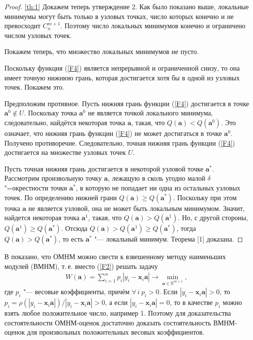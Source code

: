 \begin{proof}{\ref{th:1}}
Докажем теперь утверждение 2. Как было показано выше, локальные 
минимумы могут быть только в узловых точках, число которых конечно 
и не превосходит $C_{n}^{m+1}$. Поэтому число локальных минимумов
конечно и ограничено числом узловых точек.

Покажем теперь, что множество локальных минимумов не пусто.

Поскольку функция (\ref{F4}) является непрерывной и ограниченной 
снизу, то она имеет точную нижнюю грань,
которая достигается хотя бы в одной из узловых точек. Покажем это.

Предположим противное. Пусть нижняя грань функции (\ref{F4}) 
достигается в точке $\mathbf{a}^{0}\notin U$. Поскольку точка $\mathbf{a}^{0}$ не 
является точкой локального минимума, следовательно, найдётся 
некоторая точка $\mathbf{a}$, такая, что $Q(\mathbf{a})<Q(\mathbf{a}^{0})$. 
Это означает, что нижняя грань функции (\ref{F4}) не может достигаться в точке $\mathbf{a}^{0}$.
Получено противоречие. Следовательно, точная нижняя грань функции (\ref{F4})
достигается на множестве узловых точек $U$.

Пусть точная нижняя грань достигается в некоторой узловой точке $\mathbf{a}^{*}$.
Рассмотрим произвольную точку $\mathbf{a}$, лежащую в сколь угодно малой $\delta$"=окрестности
точки $\mathbf{a}^{*}$, в которую не попадает ни одна из остальных узловых точек. 
По определению нижней грани $Q(\mathbf{a})\ge Q(\mathbf{a}^{*})$. Поскольку при этом точка $\mathbf{a}$
не является узловой, она не может быть локальным минимумом. Значит,
найдется некоторая точка $\mathbf{a}^{1}$, такая, что $Q(\mathbf{a})>Q(\mathbf{a}^{1})$. Но,
с другой стороны, $Q(\mathbf{a}^{1})\ge Q(\mathbf{a}^{*})$. Отсюда $Q(\mathbf{a})>Q(\mathbf{a}^{1})\ge Q(\mathbf{a}^{*})$,
тогда $Q(\mathbf{a})>Q(\mathbf{a}^{*})$, то есть $\mathbf{a}^{*}$ "--- локальный минимум. Теорема [1] доказана.
\end{proof}

\smallskip

В {\cite{eighth}} показано, что ОМНМ можно свести к взвешенному методу наименьших модулей (ВМНМ), т.\,е. вместо (\ref{F2}) решать
задачу
\begin{gather} \label{F7}
W(\mathbf{a})=\sum_{i=1}^n
p_{i}\left|y_{i}-\mathbf{x}_{i}\mathbf{a} \right|\rightarrow \min
_{\mathbf{a} \in \mathbb{R}^{m+1}},
\end{gather}
 где $p_{i}$ "--- весовые коэффициенты, причём $\forall \, i ~ p_{i} > 0$. 
 Если $\left|y_{i}-\mathbf{x}_{i}\mathbf{a} \right| > 0$,
то $p_{i} = \rho \left( \left |y_{i}-\mathbf{x}_{i}\mathbf{a}\right| \right) / \left
|y_{i}-\mathbf{x}_{i}\mathbf{a}\right| > 0$, а если
$\left|y_{i}-\mathbf{x}_{i}\mathbf{a} \right| = 0$, то в качестве
$p_{i}$ можно взять любое положительное число, например 1. Поэтому
для доказательства состоятельности ОМНМ-оценок достаточно доказать
состоятельность ВМНМ-оценок для произвольных положительных весовых
коэффициентов.

